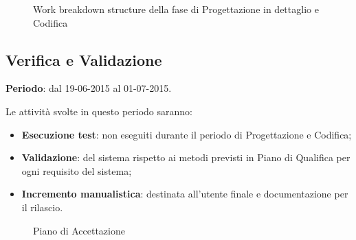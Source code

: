 {{	\begin{landscape}
		\thispagestyle{empty}
		\begin{figure}[H]
			\parbox[c][\textwidth][s]{\linewidth}{
			\centering
			\vspace*{\fill}
			\vspace*{\fill}
			\label{fig:wbsCodifica}
			\caption{Work breakdown structure della fase di Progettazione in dettaglio e Codifica}}
		\end{figure}
	\end{landscape}
}

\newpage
\subsection{Verifica e Validazione}{
	\textbf{Periodo}: dal 19-06-2015 al 01-07-2015.
	
	Le attività svolte in questo periodo saranno:
	\begin{itemize}
		\item \textbf{Esecuzione test}: non eseguiti durante il periodo di Progettazione e Codifica;
		\item \textbf{Validazione}: del sistema rispetto ai metodi previsti in Piano di Qualifica per ogni requisito del sistema;
		\item \textbf{Incremento manualistica}: destinata all'utente finale e documentazione per il rilascio.
	\end{itemize}

	\begin{landscape}
		\thispagestyle{empty}	
		\begin{figure}[H]
			\parbox[c][\textwidth][s]{\linewidth}{
			\centering
			\vspace*{\fill}
			\vspace*{\fill}
			\label{fig:pianoaccettazione}
			\caption{Piano di Accettazione}}
		\end{figure}
	\end{landscape}
	
}}
